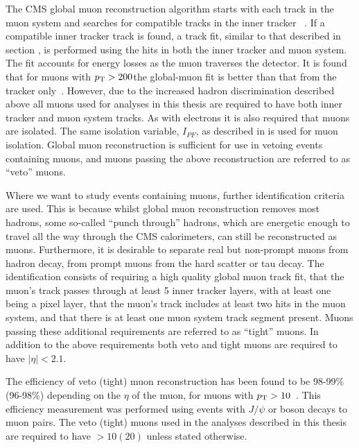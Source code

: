 The CMS global muon reconstruction algorithm starts with each track in the muon system and searches for compatible tracks in the inner tracker ~\cite{MuonReco}. If a compatible inner tracker track is found, a track fit, similar to that described in section , is performed using the hits in both the inner tracker and muon system. The fit accounts for energy losses as the muon traverses the detector. It is found that for muons with $p_{\mathrm{T}}>200$\GeV the global-muon fit is better than that from the tracker only~\cite{MuonReco}. However, due to the increased hadron discrimination described above all muons used for analyses in this thesis are required to have both inner tracker and muon system tracks. As with electrons it is also required that muons are isolated. The same isolation variable, $I_{PF}$, as described in  is used for muon isolation. Global muon reconstruction is sufficient for use in vetoing events containing muons, and muons passing the above reconstruction are referred to as ``veto'' muons.

Where we want to study events containing muons, further identification criteria are used. This is because whilst global muon reconstruction removes most hadrons, some so-called ``punch through'' hadrons, which are energetic enough to travel all the way through the CMS calorimeters, can still be reconstructed as muons. Furthermore, it is desirable to separate real but non-prompt muons from hadron decay, from prompt muons from the hard scatter or tau decay. The identification consists of requiring a high quality global muon track fit, that the muon's track passes through at least 5 inner tracker layers, with at least one being a pixel layer, that the muon's track includes at least two hits in the muon system, and that there is at least one muon system track segment present. Muons passing these additional requirements are referred to as ``tight'' muons. In addition to the above requirements both veto and tight muons are required to have $|\eta|<2.1$.

The efficiency of veto (tight) muon reconstruction has been found to be 98-99\% (96-98\%) depending on the $\eta$ of the muon, for muons with $p_{\mathrm{T}}>10$\GeV~\cite{MuonReco}. This efficiency measurement was performed using events with $J/\psi$ or \PZ boson decays to muon pairs. The veto (tight) muons used in the analyses described in this thesis are required to have \pt$>10 (20)$ \GeV unless stated otherwise.

